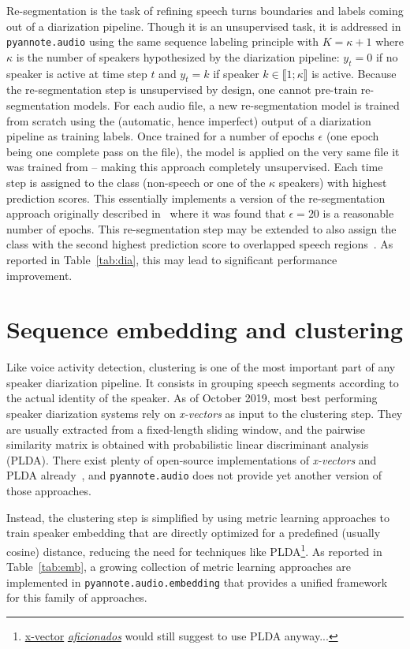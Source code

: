 \documentclass{article}
\begin{document}
Re-segmentation is the task of refining speech turns boundaries and labels coming out of a diarization pipeline.
Though it is an unsupervised task, it is addressed in {\small\texttt{pyannote.audio}} using the same sequence labeling principle with $K=\kappa + 1$ where $\kappa$ is the number of speakers hypothesized by the diarization pipeline: $y_t = 0$ if no speaker is active at time step $t$ and $y_t = k$ if speaker $k \in \llbracket 1; \kappa \rrbracket$ is active. Because the re-segmentation step is unsupervised by design, one cannot pre-train re-segmentation models.
For each audio file, a new re-segmentation model is trained from scratch using the (automatic, hence imperfect) output of a diarization pipeline as training labels. Once trained for a number of epochs $\epsilon$ (one epoch being one complete pass on the file), the model is applied on the very same file it was trained from -- making this approach completely unsupervised. Each time step is assigned to the class (non-speech or one of the $\kappa$ speakers) with highest prediction scores. This essentially implements a version of the re-segmentation approach originally described in~\cite{Yin2018} where it was found that $\epsilon = 20$ is a reasonable number of epochs. This re-segmentation step may be extended to also assign the class with the second highest prediction score to overlapped speech regions~\cite{Bullock2020}. As reported in Table~\ref{tab:dia}, this may lead to significant performance improvement.

\vspace{-0.17cm}
\section{Sequence embedding and clustering}
\label{sec:clustering}

Like voice activity detection, clustering is one of the most important part of any speaker diarization pipeline.
It consists in grouping speech segments according to the actual identity of the speaker. As of October 2019, most best performing speaker diarization systems rely on \emph{x-vectors} as input to the clustering step. They are usually extracted from a fixed-length sliding window, and the pairwise similarity matrix is obtained with probabilistic linear discriminant analysis (PLDA).
There exist plenty of open-source implementations of \emph{x-vectors} and PLDA already~\cite{S4D, kaldi}, and {\small\texttt{pyannote.audio}} does not provide yet another version of those approaches.

Instead, the clustering step is simplified by using metric learning approaches to train speaker embedding that are directly optimized for a predefined (usually cosine) distance, reducing the need for techniques like PLDA\footnote{\href{https://www.clsp.jhu.edu/faculty/jesus-villalba/}{x-vector} \href{https://www.clsp.jhu.edu/faculty/paola-garcia/}{\emph{aficionados}} would still suggest to use PLDA anyway...}. As reported in Table~\ref{tab:emb}, a growing collection of metric learning approaches are implemented in {\small \texttt{pyannote.audio.embedding}} that provides a unified framework for this family of approaches.
\end{document}
